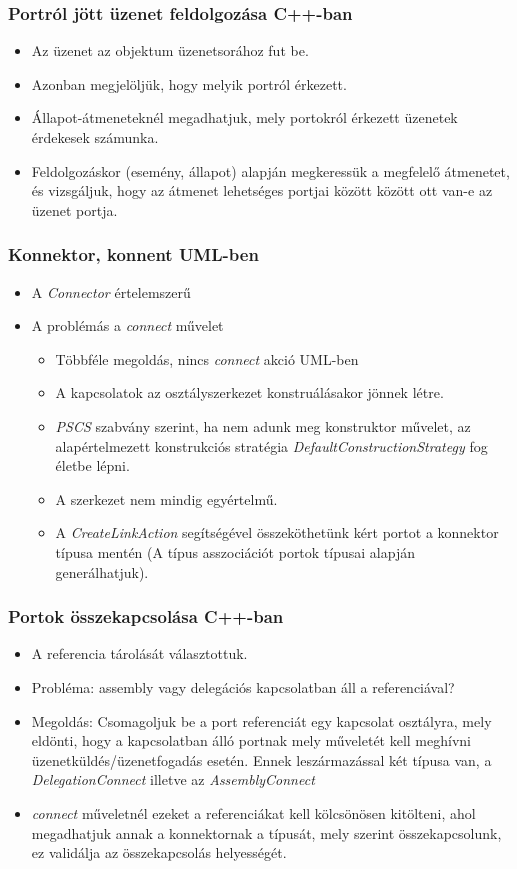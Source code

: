 \documentclass[11pt]{beamer}
\begin{document}
\begin{frame}[fragile]
	\frametitle{Portról jött üzenet feldolgozása C++-ban}
	\begin{itemize}
	\item Az üzenet az objektum üzenetsorához fut be.
	\item Azonban megjelöljük, hogy melyik portról érkezett.
	\item Állapot-átmeneteknél megadhatjuk, mely portokról érkezett üzenetek érdekesek számunka.
	\item Feldolgozáskor (esemény, állapot) alapján megkeressük a megfelelő átmenetet, és vizsgáljuk, hogy az átmenet lehetséges portjai között között ott van-e az üzenet portja.
	\end{itemize}

\end{frame}

\begin{frame}
	\frametitle{Konnektor, konnent UML-ben}
	\begin{itemize}
	\item A \textit{Connector} értelemszerű
	\item A problémás a \textit{connect} művelet
		\begin{itemize}
		\item Többféle megoldás, nincs \textit{connect} akció UML-ben
		\item A kapcsolatok az osztályszerkezet konstruálásakor jönnek létre.
		\item \textit{PSCS} szabvány szerint, ha nem adunk meg konstruktor művelet, az alapértelmezett konstrukciós stratégia \textit{DefaultConstructionStrategy} fog életbe lépni.
		\item A szerkezet nem mindig egyértelmű.
		\item A \textit{CreateLinkAction} segítségével összeköthetünk kért portot a konnektor típusa mentén (A típus asszociációt portok típusai alapján generálhatjuk).
		\end{itemize}
	\end{itemize}
\end{frame}

\begin{frame}
	\frametitle{Portok összekapcsolása C++-ban}
	\begin{itemize}
	\item A referencia tárolását választottuk.
	\item Probléma: assembly vagy delegációs kapcsolatban áll a referenciával?
	\item Megoldás: Csomagoljuk be a port referenciát egy kapcsolat osztályra, mely eldönti, hogy a kapcsolatban álló portnak mely műveletét kell meghívni üzenetküldés/üzenetfogadás esetén. Ennek leszármazással két típusa van, a \textit{DelegationConnect} illetve az \textit{AssemblyConnect} 
	\item \textit{connect} műveletnél ezeket a referenciákat kell kölcsönösen kitölteni, ahol megadhatjuk annak a konnektornak a típusát, mely szerint összekapcsolunk, ez validálja az összekapcsolás helyességét. 
	\end{itemize}
		
\end{frame}
\end{document}

